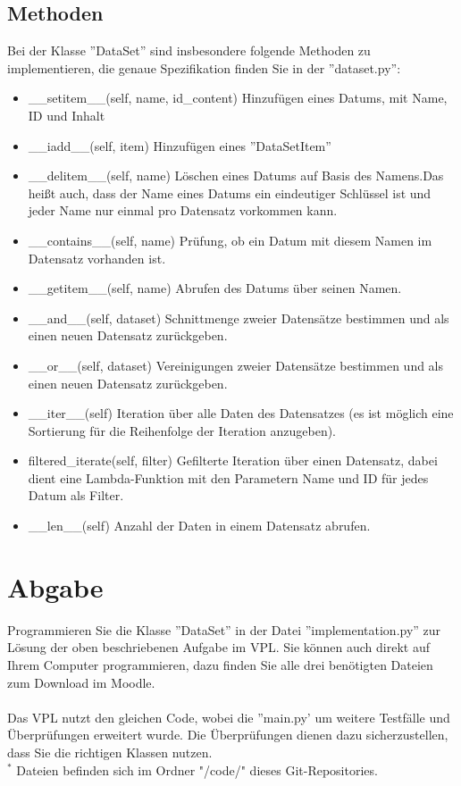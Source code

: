 \documentclass[
 oneside, %
 12pt, %
 a4paper, %
 parskip=full %
]{scrartcl}
\begin{document}
\subsection{Methoden}
Bei der Klasse ''DataSet'' sind insbesondere folgende Methoden zu implementieren, die genaue Spezifikation finden Sie in der ''dataset.py'':
\begin{itemize}
\setlength{\parskip}{1pt}
    \item {\_\_setitem\_\_(self, name, id\_content) Hinzufügen eines Datums, mit Name, ID und Inhalt}
    \item {\_\_iadd\_\_(self, item)} Hinzufügen eines ''DataSetItem''
    \item {\_\_delitem\_\_(self, name)} Löschen eines Datums auf Basis des Namens.Das heißt auch, dass der Name eines Datums ein eindeutiger Schlüssel ist und jeder Name nur einmal pro Datensatz vorkommen kann.
    \item {\_\_contains\_\_(self, name)} Prüfung, ob ein Datum mit diesem Namen im Datensatz vorhanden ist.
    \item {\_\_getitem\_\_(self, name)} Abrufen des Datums über seinen Namen. 
    \item {\_\_and\_\_(self, dataset)} Schnittmenge zweier Datensätze bestimmen und als einen neuen Datensatz zurückgeben.
    \item {\_\_or\_\_(self, dataset)} Vereinigungen zweier Datensätze bestimmen und als einen neuen Datensatz zurückgeben.
    \item {\_\_iter\_\_(self)} Iteration über alle Daten des Datensatzes (es ist möglich eine Sortierung für die Reihenfolge der Iteration anzugeben).
    \item {filtered\_iterate(self, filter)} Gefilterte Iteration über einen Datensatz, dabei dient eine Lambda-Funktion mit den Parametern Name und ID für jedes Datum als Filter.
    \item {\_\_len\_\_(self)} Anzahl der Daten in einem Datensatz abrufen.
\end{itemize}

\section{Abgabe}
Programmieren Sie die Klasse ''DataSet'' in der Datei ''implementation.py'' zur Lösung der oben beschriebenen Aufgabe im VPL.
Sie können auch direkt auf Ihrem Computer programmieren, dazu finden Sie alle drei benötigten Dateien zum Download im Moodle.\\
\\
Das VPL nutzt den gleichen Code, wobei die ''main.py' um weitere Testfälle und Überprüfungen erweitert wurde.
Die Überprüfungen dienen dazu sicherzustellen, dass Sie die richtigen Klassen nutzen.\\
$^*$ Dateien befinden sich im Ordner "/code/" dieses Git-Repositories.\\
\end{document}
